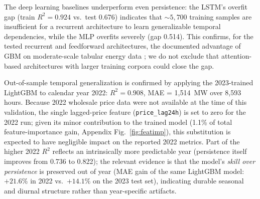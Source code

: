 \documentclass[preprint,12pt,authoryear]{elsarticle}
\begin{document}
\begin{table}[htbp]
\centering
\caption{Day-ahead net load forecasting benchmark (test set: November--December 2023). DM test against persistence.}
\label{tab:benchmark}
\small
{}
\end{table}

The deep learning baselines underperform even persistence: the LSTM's overfit gap (train $R^2 = 0.924$ vs.\ test 0.676) indicates that ${\sim}5{,}700$ training samples are insufficient for a recurrent architecture to learn generalizable temporal dependencies, while the MLP overfits severely (gap 0.514). This confirms, for the tested recurrent and feedforward architectures, the documented advantage of GBM on moderate-scale tabular energy data \citep{hertel2022,grinsztajn2022}; we do not exclude that attention-based architectures with larger training corpora could close the gap.

Out-of-sample temporal generalization is confirmed by applying the 2023-trained LightGBM to calendar year 2022: $R^2 = 0.908$, MAE = 1{,}514~MW over 8{,}593 hours. Because 2022 wholesale price data were not available at the time of this validation, the single lagged-price feature (\texttt{price\_lag24h}) is set to zero for the 2022 run; given its minor contribution to the trained model (1.1\% of total feature-importance gain, Appendix Fig.~\ref{fig:featimp}), this substitution is expected to have negligible impact on the reported 2022 metrics. Part of the higher 2022 $R^2$ reflects an intrinsically more predictable year (persistence itself improves from 0.736 to 0.822); the relevant evidence is that the model's \emph{skill over persistence} is preserved out of year (MAE gain of the same LightGBM model: $+21.6\%$ in 2022 vs.\ $+14.1\%$ on the 2023 test set), indicating durable seasonal and diurnal structure rather than year-specific artifacts.
\end{document}
